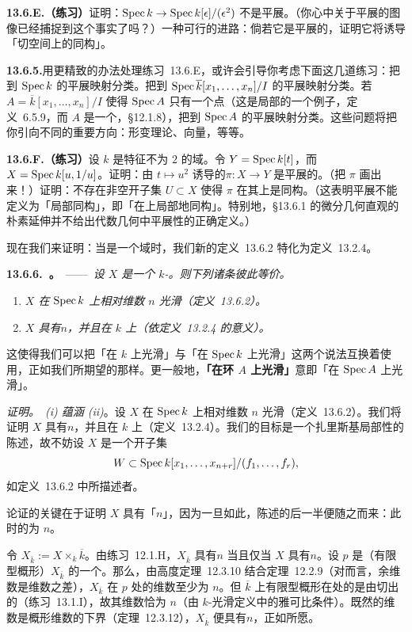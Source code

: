 \textbf{13.6.E.（练习）}\quad 证明：$\operatorname{Spec} k\to\operatorname{Spec} k[\epsilon]/(\epsilon^2)$ 不是平展\trMorphism。（你心中关于平展\trMorphism{}的图像已经捕捉到这个事实了吗？）一种可行的进路：倘若它是平展的，证明它将诱导「切空间上的同构」。

\textbf{13.6.5.}\quad 用更精致的办法处理\mbox{练习~13.6.E}，或许会引导你考虑下面这几道练习：把到 $\operatorname{Spec} k$ 的平展映射分类。把到 $\operatorname{Spec}\overline{k}[x_1,\dots,x_n]/I$ 的平展映射分类。若 $A=\overline{k}[x_1,\dots,x_n]/I$ 使得 $\operatorname{Spec} A$ 只有一个点（这是\trArtinian{}局部\trScheme{}的一个例子，定义~6.5.9，而 $A$ 是一个\trArtinian\trLocalRing，\S12.1.8），把到 $\operatorname{Spec} A$ 的平展映射分类。这些问题将把你引向不同的重要方向：形变理论、\trWitt{}向量，等等。

\textbf{13.6.F.（练习）}\quad 设 $k$ 是特征不为 $2$ 的域。令 $Y=\operatorname{Spec} k[t]$，而 $X=\operatorname{Spec} k[u,1/u]$。证明：由 $t\mapsto u^2$ 诱导的\trMorphism $\pi\colon X\to Y$ 是平展的。（把 $\pi$ 画出来！）证明：不存在非空开子集 $U\subset X$ 使得 $\pi$ 在其上是同构。（这表明平展不能定义为「局部同构」，即「在\trSource{}上局部地同构」。特别地，\S13.6.1 的微分几何直观的朴素延伸并不给出代数几何中平展性的正确定义。）

现在我们来证明：当\trTarget{}是一个域时，我们新的定义~13.6.2 特化为定义~13.2.4。

\textbf{13.6.6.\ \trhTheorem{}。}\ ——\ \emph{设 $X$ 是一个 $k$-\trScheme。则下列诸条彼此等价。}
\begin{enumerate}[label=(\roman*)]
\item \emph{$X$ 在 $\operatorname{Spec} k$ 上相对维数 $n$ 光滑（定义~13.6.2）。}
\item \emph{$X$ 具有\trPureDimension $n$，并且在 $k$ 上\trSmooth{}（依定义~13.2.4 的意义）。}
\end{enumerate}

这使得我们可以把「在 $k$ 上光滑」与「在 $\operatorname{Spec} k$ 上光滑」这两个说法互换着使用，正如我们所期望的那样。更一般地，\textbf{「在环 $A$ 上光滑」}意即「在 $\operatorname{Spec} A$ 上光滑」。

\emph{证明。}\ \emph{(i) 蕴涵 (ii)}。设 $X$ 在 $\operatorname{Spec} k$ 上相对维数 $n$ 光滑（定义~13.6.2）。我们将证明 $X$ 具有\trPureDimension $n$，并且在 $k$ 上\trSmooth{}（定义~13.2.4）。我们的目标是一个扎里斯基局部性的陈述，故不妨设 $X$ 是一个开子集
\[
W\subset\operatorname{Spec} k[x_1,\dots,x_{n+r}]/(f_1,\dots,f_r),
\]
如定义~13.6.2 中所描述者。

论证的关键在于证明 $X$ 具有「\trPureDimension $n$」，因为一旦如此，陈述的后一半便随之而来：此时\trJacobianMatrix{}的\trCorank{}为 $n$。

令 $X_{\overline{k}}:=X\times_k\overline{k}$。由\mbox{练习~12.1.H}，$X_{\overline{k}}$ 具有\trPureDimension $n$ 当且仅当 $X$ 具有\trPureDimension $n$。设 $p$ 是（有限型概形）$X_{\overline{k}}$ 的一个\trClosedPoint。那么，由\trKrull{}高度定理~12.3.10 结合定理~12.2.9（对\trVariety{}而言，余维数是维数之差），$X_{\overline{k}}$ 在 $p$ 处的维数至少为 $n$。但 $\overline{k}$ 上有限型概形在\trClosedPoint{}处的\trZariski{}\trTangentSpace{}是由\trJacobianMatrix{}切出的（\mbox{练习~13.1.I}），故其维数恰为 $n$（由 $k$-光滑定义中的雅可比条件）。既然\trZariski{}\trTangentSpace{}的维数是概形维数的下界（定理~12.3.12），$X_{\overline{k}}$ 便具有\trPureDimension $n$，正如所愿。

